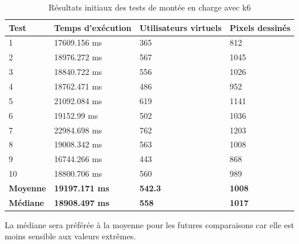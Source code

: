 \begin{table}[H]
  \centering
  \begin{tabular}{|l|l|l|l|}
    \hline
    \textbf{Test}    & \textbf{Temps d'exécution} & \textbf{Utilisateurs virtuels} & \textbf{Pixels dessinés} \\ \hline
    1                & 17609.156 ms               & 365                            & 812                      \\ \hline
    2                & 18976.272 ms               & 567                            & 1045                     \\ \hline
    3                & 18840.722 ms               & 556                            & 1026                     \\ \hline
    4                & 18762.471 ms               & 486                            & 952                      \\ \hline
    5                & 21092.084 ms               & 619                            & 1141                     \\ \hline
    6                & 19152.99 ms                & 502                            & 1036                     \\ \hline
    7                & 22984.698 ms               & 762                            & 1203                     \\ \hline
    8                & 19008.342 ms               & 563                            & 1008                     \\ \hline
    9                & 16744.266 ms               & 443                            & 868                      \\ \hline
    10               & 18800.706 ms               & 560                            & 989                      \\ \hline
    \textbf{Moyenne} & \textbf{19197.171 ms}      & \textbf{542.3}                 & \textbf{1008}            \\ \hline
    \textbf{Médiane} & \textbf{18908.497 ms}      & \textbf{558}                   & \textbf{1017}            \\ \hline
  \end{tabular}
  \caption{Résultats initiaux des tests de montée en charge avec k6}
  \label{table:k6-initial-results}
\end{table}

La médiane sera préférée à la moyenne pour les futures comparaisons car elle est moins sensible aux valeurs extrêmes.

